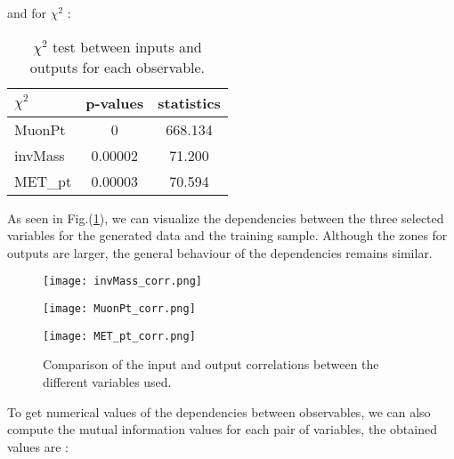 and for $\chi^2$ :
\begin{table}[H]
    \centering
    \begin{tabular}{|l|c|c|}
        \hline
        \textbf{$\chi^2$} & \textbf{p-values} & \textbf{statistics}  \\
        \hline
        MuonPt & 0 & 668.134\\
        invMass & 0.00002 & 71.200\\
        MET\_pt & 0.00003 & 70.594\\
        \hline
    \end{tabular}
     \caption{$\chi^2$ test between inputs and outputs for each observable.}
\end{table}

As seen in Fig.(\ref{all corr}), we can visualize the dependencies between the three selected variables for the generated data and the training sample. Although the zones for outputs are larger, the general behaviour of the dependencies remains similar.

\begin{figure}[H]
    \centering
    \texttt{[image: invMass\_corr.png]}
\end{figure}

\vspace{-\baselineskip} %

\begin{figure}[H]
    \centering
    \texttt{[image: MuonPt\_corr.png]}
\end{figure}

\vspace{-\baselineskip} %

\begin{figure}[H]
    \centering
    \texttt{[image: MET\_pt\_corr.png]}
    \caption{Comparison of the input and output correlations between the different variables used.}
    \label{all corr}
\end{figure}
To get numerical values of the dependencies between observables, we can also compute the mutual information values for each pair of variables, the obtained values are :

